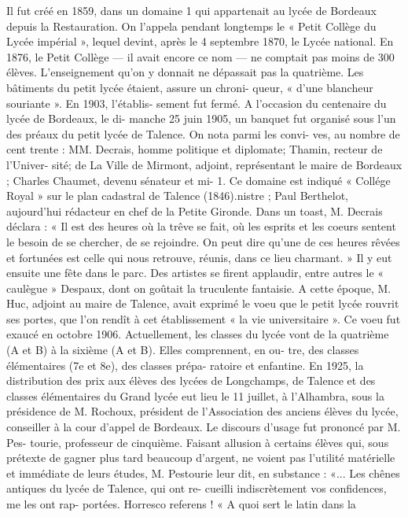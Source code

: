 \documentclass[a4paper,11pt]{book}
\begin{document}
Il fut créé en 1859, dans un domaine 1 qui appartenait
au lycée de Bordeaux depuis la Restauration.
On l'appela pendant longtemps le « Petit Collège du
Lycée impérial », lequel devint, après le 4 septembre 1870,
le Lycée national.
En 1876, le Petit Collège — il avait encore ce nom — ne
comptait pas moins de 300 élèves. L'enseignement qu'on y
donnait ne dépassait pas la quatrième.
Les bâtiments du petit lycée étaient, assure un chroni-
queur, « d'une blancheur souriante ». En 1903, l'établis-
sement fut fermé.
A l'occasion du centenaire du lycée de Bordeaux, le di-
manche 25 juin 1905, un banquet fut organisé sous l'un des
préaux du petit lycée de Talence. On nota parmi les convi-
ves, au nombre de cent trente : MM. Decrais, homme
politique et diplomate; Thamin, recteur de l'Univer-
sité; de La Ville de Mirmont, adjoint, représentant le maire
de Bordeaux ; Charles Chaumet, devenu sénateur et mi-
1. Ce domaine est indiqué « Collége Royal » sur le plan cadastral de
Talence (1846).nistre ; Paul Berthelot, aujourd'hui rédacteur en chef de
la Petite Gironde.
Dans un toast, M. Decrais déclara :
« Il est des heures où la trêve se fait, où les esprits et
les coeurs sentent le besoin de se chercher, de se rejoindre.
On peut dire qu'une de ces heures rêvées et fortunées est
celle qui nous retrouve, réunis, dans ce lieu charmant. »
Il y eut ensuite une fête dans le parc. Des artistes se
firent applaudir, entre autres le « caulègue » Despaux,
dont on goûtait la truculente fantaisie.
A cette époque, M. Huc, adjoint au maire de Talence,
avait exprimé le voeu que le petit lycée rouvrit ses portes,
que l'on rendît à cet établissement « la vie universitaire ».
Ce voeu fut exaucé en octobre 1906.
Actuellement, les classes du lycée vont de la quatrième
(A et B) à la sixième (A et B). Elles comprennent, en ou-
tre, des classes élémentaires (7e et 8e), des classes prépa-
ratoire et enfantine.
En 1925, la distribution des prix aux élèves des lycées
de Longchamps, de Talence et des classes élémentaires du
Grand lycée eut lieu le 11 juillet, à l'Alhambra, sous la
présidence de M. Rochoux, président de l'Association des
anciens élèves du lycée, conseiller à la cour d'appel de
Bordeaux. Le discours d'usage fut prononcé par M. Pes-
tourie, professeur de cinquième. Faisant allusion à certains
élèves qui, sous prétexte de gagner plus tard beaucoup
d'argent, ne voient pas l'utilité matérielle et immédiate de
leurs études, M. Pestourie leur dit, en substance :
«... Les chênes antiques du lycée de Talence, qui ont re-
cueilli indiscrètement vos confidences, me les ont rap-
portées. Horresco referens ! « A quoi sert le latin dans la
\end{document}
